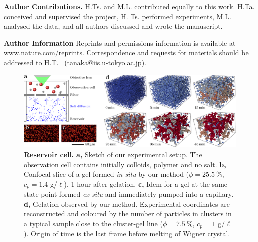 \documentclass[preprint,footinbib,amsmath,amssymb,superscriptaddress]{revtex4}
\begin{document}
\noindent
{\bf Author Contributions.} H.Ts. and M.L. contributed equally to this work. 
H.Ta. conceived and supervised the project, H. Ts. performed experiments, M.L. analysed the data, and all authors discussed and wrote the manuscript. 

\noindent
{\bf Author Information} Reprints and permissions information is available at www.nature.com/reprints.
Correspondence and requests for materials should be addressed to H.T. ~(tanaka@iis.u-tokyo.ac.jp).

\clearpage
\begin{figure}
	\includegraphics{figs/cell_vs_cap2.pdf}
	\caption{\textbf{Reservoir cell.} \textbf{a,} Sketch of our experimental setup. The observation cell contains initially colloids, polymer and no salt. \textbf{b,} Confocal slice of a gel formed \textit{in situ} by our method ($\phi=25.5~\%$, $c_p=1.4$ g/$\ell$), 1 hour after gelation. \textbf{c,} Idem for a gel at the same state point formed \textit{ex situ} and immediately pumped into a capillary. \textbf{d,} Gelation observed by our method. Experimental coordinates are reconstructed and coloured by the number of particles in clusters in a typical sample close to the cluster-gel line ($\phi=7.5~\%$, $c_p=1$ g/$\ell$). Origin of time is the last frame before melting of Wigner crystal.
	}
	\label{fig:cell_vs_cap}
\end{figure}
\end{document}
